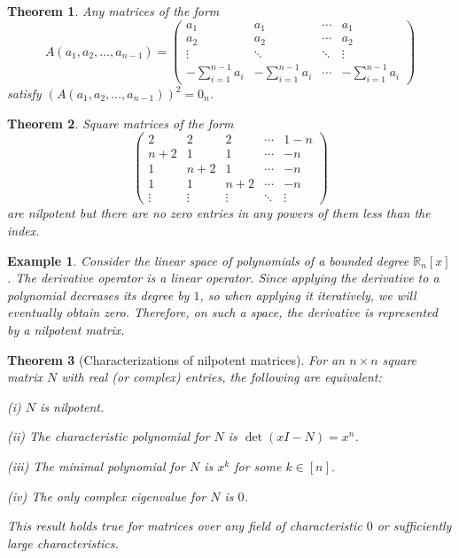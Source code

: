 \documentclass{article}
\newtheorem{example}{Example}
\newtheorem{theorem}{Theorem}
\begin{document}
\begin{theorem}
	Any matrices of the form
	\begin{equation*}
		A(a_1,a_2,\ldots,a_{n-1}) = \begin{pmatrix}
			a_1 & a_1 & \cdots & a_1\\a_2 & a_2 & \cdots & a_2\\\vdots & \ddots & \ddots & \vdots\\-\sum_{i=1}^{n-1} a_i & -\sum_{i=1}^{n-1} a_i & \cdots & -\sum_{i=1}^{n-1} a_i
		\end{pmatrix}
	\end{equation*}
	satisfy $(A(a_1,a_2,\ldots,a_{n-1}))^2 = 0_n$.
\end{theorem}

\begin{theorem}
	Square matrices of the form
	\begin{equation*}
		\begin{pmatrix}
			2 & 2 & 2 & \cdots & 1 - n\\n + 2 & 1 & 1 & \cdots & -n\\1 & n + 2 & 1 & \cdots & -n\\1 & 1 & n + 2 & \cdots & -n\\\vdots & \vdots & \vdots & \ddots & \vdots
		\end{pmatrix}
	\end{equation*}
	are nilpotent but there are no zero entries in any powers of them less than the index.
\end{theorem}

\begin{example}
	Consider the linear space of polynomials of a bounded degree $\mathbb{R}_n[x]$. The derivative operator is a linear operator. Since applying the derivative to a polynomial decreases its degree by $1$, so when applying it iteratively, we will eventually obtain zero. Therefore, on such a space, the derivative is represented by a nilpotent matrix.
\end{example}

\begin{theorem}[Characterizations of nilpotent matrices]
	For an $n\times n$ square matrix $N$ with real (or complex) entries, the following are equivalent:
	\item(i) $N$ is nilpotent.
	\item(ii) The characteristic polynomial for $N$ is $\det(xI - N) = x^n$.
	\item(iii) The minimal polynomial for $N$ is $x^k$ for some $k\in[n]$.
	\item(iv) The only complex eigenvalue for $N$ is $0$.
	
	This result holds true for matrices over any field of characteristic $0$ or sufficiently large characteristics.
\end{theorem}
\end{document}
